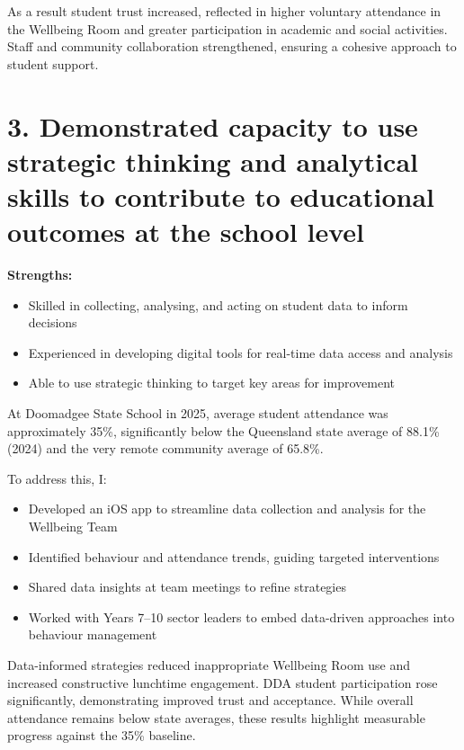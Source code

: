 \documentclass[11pt,a4paper]{article}
\begin{document}
As a result student trust increased, reflected in higher voluntary attendance in the Wellbeing Room and greater participation in academic and social activities. Staff and community collaboration strengthened, ensuring a cohesive approach to student support.

\section*{3. Demonstrated capacity to use strategic thinking and analytical skills to contribute to educational outcomes at the school level}

\textbf{Strengths:}
\begin{itemize}
    \item Skilled in collecting, analysing, and acting on student data to inform decisions
    \item Experienced in developing digital tools for real-time data access and analysis
    \item Able to use strategic thinking to target key areas for improvement
\end{itemize}

At Doomadgee State School in 2025, average student attendance was approximately 35\%, significantly below the Queensland state average of 88.1\% (2024) and the very remote community average of 65.8\%.

To address this, I:
\begin{itemize}
    \item Developed an iOS app to streamline data collection and analysis for the Wellbeing Team
    \item Identified behaviour and attendance trends, guiding targeted interventions
    \item Shared data insights at team meetings to refine strategies
    \item Worked with Years 7–10 sector leaders to embed data-driven approaches into behaviour management
\end{itemize}

Data-informed strategies reduced inappropriate Wellbeing Room use and increased constructive lunchtime engagement. DDA student participation rose significantly, demonstrating improved trust and acceptance. While overall attendance remains below state averages, these results highlight measurable progress against the 35\% baseline.

\end{document}
